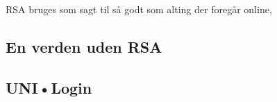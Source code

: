 RSA bruges som sagt til så godt som alting der foregår online,

\subsection{En verden uden RSA}



\subsection{UNI•Login}


